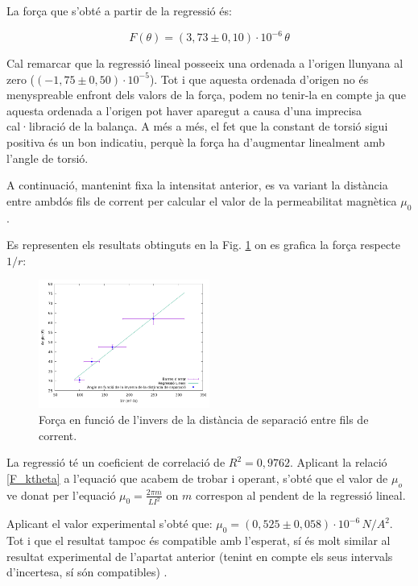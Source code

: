 \documentclass[11pt]{article}
\numberwithin{equation}{section}
\numberwithin{figure}{section}
\numberwithin{table}{section}
\begin{document}
La força que s’obté a partir de la regressió és:

\begin{equation}\label{F_ktheta}
    F(\theta) = (3,73 \pm 0,10) \cdot 10^{-6}\, \theta
\end{equation}

Cal remarcar que la regressió lineal posseeix una ordenada a l’origen llunyana al zero ($(-1,75 \pm 0,50)·10^{-5}$). Tot i que aquesta ordenada d’origen no és menyspreable enfront dels valors de la força, podem no tenir-la en compte ja que aquesta ordenada a l'origen pot haver aparegut a causa d’una imprecisa cal·libració de la balança. A més a més, el fet que la constant de torsió sigui positiva és un bon indicatiu, perquè la força ha d’augmentar linealment amb l’angle de torsió.

A continuació, mantenint fixa la intensitat anterior, es va variant la distància entre ambdós fils de corrent per calcular el valor de la permeabilitat magnètica $\mu_0$. 

Es representen els resultats obtinguts en la Fig. \ref{fig: PR2_regr_thetavsr} on es grafica la força respecte $1/r$:

\begin{figure}[H]
    \centering
    \includegraphics[width=0.5\textwidth]{PR2_regr_thetavsr.png}
    \caption{Força en funció de l’invers de la distància de separació entre fils de corrent.}
    \label{fig: PR2_regr_thetavsr}
\end{figure}

La regressió té un coeficient de correlació de $R^2 = 0,9762$.
Aplicant la relació \eqref{F_ktheta} a l'equació que acabem de trobar i operant, s’obté que el valor de $\mu_o$ ve donat per l’equació $\mu_0 = \frac{2\pi m}{LI^2}$ on $m$ correspon al pendent de la regressió lineal. 

Aplicant el valor experimental s’obté que: $\mu_0 = (0,525 \pm 0,058) \cdot 10^{-6}\, N/A^2$. Tot i que el resultat tampoc és compatible amb l’esperat, sí és molt similar al resultat experimental de l’apartat anterior (tenint en compte els seus intervals d'incertesa, sí són compatibles) . 
\end{document}
